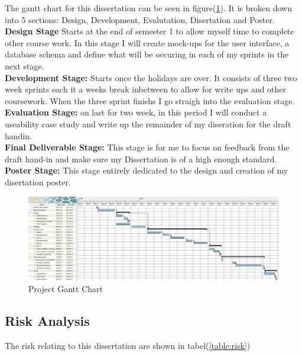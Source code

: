 \documentclass[12pt]{article}  %
\theoremstyle{definition}
\theoremstyle{remark}
\begin{document}
The gantt chart for this dissertation can be seen in figure(\ref{fig:ganttchart}). It is broken down into 5 sections: Design, Development, Evalutation, Disertation and Poster.\\
\textbf{Design Stage} Starts at the end of semester 1 to allow myself time to complete other course work. In this stage I will create mock-ups for the user interface, a database schema and define what will be occuring in each of my sprints in the next stage.\\
\textbf{Development Stage:} Starts once the holidays are over. It consists of three two week sprints each it a weeks break inbetween to allow for write ups and other coursework. When the three sprint finishs I go straigh into the evaluation stage.\\ 
\textbf{Evaluation Stage: } on last for two week, in this period I will conduct a useability case study and write up the remainder of my diseration for the draft handin.\\
\textbf{Final Deliverable Stage:} This stage is for me to focus on feedback from the draft hand-in and make sure my Dissertation is of a high enough standard.\\
\textbf{Poster Stage:} This stage entirely dedicated to the design and creation of my disertation poster.

\begin{figure}[!htbp]

\includegraphics[width=\textwidth]{images/ganttchart.png}
\caption{Project Gantt Chart}
\label{fig:ganttchart}

\end{figure}




\subsection{Risk Analysis}
 
The risk relating to this dissertation are shown in tabel(\ref{table:risk})
\end{document}
